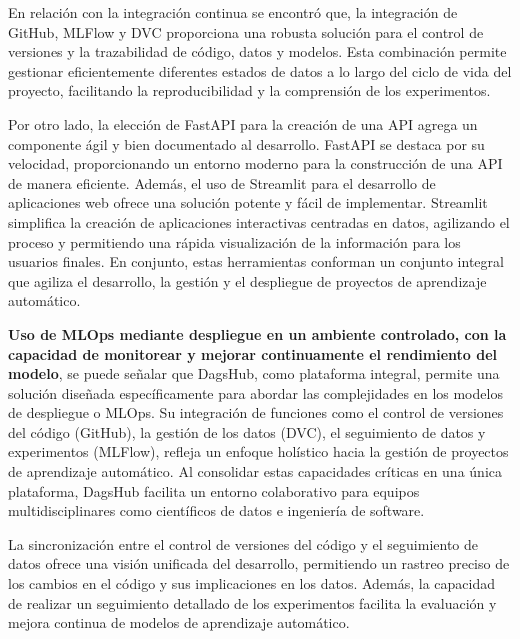 \newpage

En relación con la integración continua se encontró que, la integración de GitHub, MLFlow y DVC  proporciona una robusta solución para el control de versiones y la trazabilidad de código, datos y modelos. Esta combinación permite gestionar eficientemente diferentes estados de datos a lo largo del ciclo de vida del proyecto, facilitando la reproducibilidad y la comprensión de los experimentos. \newline

Por otro lado, la elección de FastAPI para la creación de una API agrega un componente ágil y bien documentado al desarrollo. FastAPI se destaca por su velocidad, proporcionando un entorno moderno para la construcción de una API de manera eficiente. Además, el uso de Streamlit para el desarrollo de aplicaciones web ofrece una solución potente y fácil de implementar. Streamlit simplifica la creación de aplicaciones interactivas centradas en datos, agilizando el proceso y permitiendo una rápida visualización de la información para los usuarios finales. En conjunto, estas herramientas conforman un conjunto integral que agiliza el desarrollo, la gestión y el despliegue de proyectos de aprendizaje automático. \newline

\textbf{Uso de MLOps mediante despliegue en un ambiente controlado, con la capacidad de monitorear y mejorar continuamente el rendimiento del modelo}, se puede señalar que DagsHub, como plataforma integral, permite una solución diseñada específicamente para abordar las complejidades en los modelos de despliegue o MLOps. Su integración de funciones como el control de versiones del código (GitHub), la gestión de los datos (DVC), el seguimiento de datos y experimentos (MLFlow), refleja un enfoque holístico hacia la gestión de proyectos de aprendizaje automático. Al consolidar estas capacidades críticas en una única plataforma, DagsHub facilita un entorno colaborativo para equipos multidisciplinares como científicos de datos e ingeniería de software.

\newpage

La sincronización entre el control de versiones del código y el seguimiento de datos ofrece una visión unificada del desarrollo, permitiendo un rastreo preciso de los cambios en el código y sus implicaciones en los datos. Además, la capacidad de realizar un seguimiento detallado de los experimentos facilita la evaluación y mejora continua de modelos de aprendizaje automático. \newline

